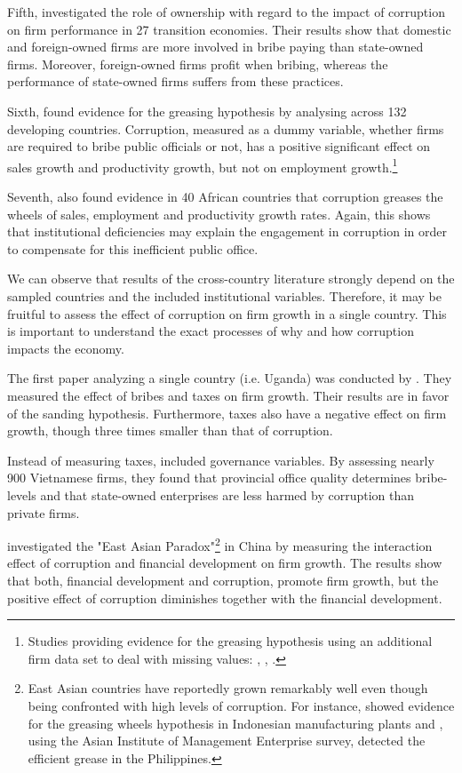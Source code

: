 Fifth, \citet{blagojevic2013impact} investigated the role of ownership with regard to the impact of corruption on firm performance in 27 transition economies. Their results show that domestic and foreign-owned firms are more involved in bribe paying than state-owned firms. Moreover, foreign-owned firms profit when bribing, whereas the performance of state-owned firms suffers from these practices. 

Sixth, \citet{williams2016does} found evidence for the greasing hypothesis by analysing across 132 developing countries. Corruption, measured as a dummy variable, whether firms are required to bribe public officials or not, has a positive significant effect on sales growth and productivity growth, but not on employment growth.\footnote{Studies providing evidence for the greasing hypothesis using an additional firm data set to deal with missing values: \citet{meon2010corruption}, \citet{kochanova2012impact}, \citet{hanousek2015bribery}.}

Seventh, \citet{williams2016impacts} also found evidence in 40 African countries that corruption greases the wheels of sales, employment and productivity growth rates. Again, this shows that institutional deficiencies may explain the engagement in corruption in order to compensate for this inefficient public office.

We can observe that results of the cross-country literature strongly depend on the sampled countries and the included institutional variables. Therefore, it may be fruitful to assess the effect of corruption on firm growth in a single country. This is important to understand the exact processes of why and how corruption impacts the economy.

The first paper analyzing a single country (i.e. Uganda) was conducted by \citet{fisman2007corruption}. They measured the effect of bribes and taxes on firm growth. Their results are in favor of the sanding hypothesis. Furthermore, taxes also have a negative effect on firm growth, though three times smaller than that of corruption. 

Instead of measuring taxes, \citet{nguyen2012corruption} included governance variables. By assessing nearly 900 Vietnamese firms, they found that provincial office quality determines bribe-levels and that state-owned enterprises are less harmed by corruption than private firms. 

\citet{wang2012corruption} investigated the "East Asian Paradox"\footnote{East Asian countries have reportedly grown remarkably well even though being confronted with high levels of corruption. For instance, \citet{vial2010corruption} showed evidence for the greasing wheels hypothesis in Indonesian manufacturing plants and \citet{mendoza2015grease}, using the Asian Institute of Management Enterprise survey, detected the efficient grease in the Philippines.} in China by measuring the interaction effect of corruption and financial development on firm growth. The results show that both, financial development and corruption, promote firm growth, but the positive effect of corruption diminishes together with the financial development.

